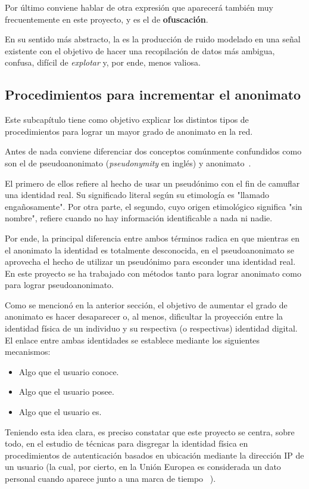 Por último conviene hablar de otra expresión que aparecerá también muy
frecuentemente en este proyecto, y es el de \textbf{ofuscación}.

En su sentido más abstracto, la  es la producción de ruido modelado en una señal existente con el objetivo de hacer una recopilación de datos más ambigua, confusa, difícil de \textit{explotar} y, por ende, menos valiosa.

\subsection{Procedimientos para incrementar el anonimato}

Este subcapítulo tiene como objetivo explicar los distintos tipos de
procedimientos para lograr un mayor grado de anonimato en la red.

Antes de nada conviene diferenciar dos conceptos comúnmente
confundidos como son el de pseudoanonimato (\textit{pseudonymity} en
inglés) y anonimato~\cite{article:anopseudo}.

El primero de ellos refiere al hecho de usar un pseudónimo con el fin
de camuflar una identidad real. Su significado literal según su
etimología es "llamado engañosamente".  Por otra parte, el segundo,
cuyo origen etimológico significa "sin nombre", refiere cuando no hay
información identificable a nada ni nadie.

Por ende, la principal diferencia entre ambos términos radica en que
mientras en el anonimato la identidad es totalmente desconocida, en el
pseudoanonimato se aprovecha el hecho de utilizar un pseudónimo para
esconder una identidad real.  En este proyecto se ha trabajado con
métodos tanto para lograr anonimato como para lograr
pseudoanonimato. 

Como se mencionó en la anterior sección, el objetivo de aumentar el grado
de anonimato es hacer desaparecer o, al menos, dificultar la proyección entre
la identidad física de un individuo y su respectiva (o respectivas) identidad 
digital. El enlace entre ambas identidades se establece mediante los siguientes
mecanismos:
\begin{itemize}
	\item Algo que el usuario conoce.
	\item Algo que el usuario posee.
	\item Algo que el usuario es.
\end{itemize}

Teniendo esta idea clara, es preciso constatar que este proyecto se centra, sobre todo, en el estudio de técnicas para disgregar la identidad física
en procedimientos de autenticación basados en ubicación mediante la dirección IP de un usuario (la cual, por cierto, en la Unión Europea es considerada un dato personal cuando aparece junto a una marca de tiempo ~\cite{article:dirIP}).

